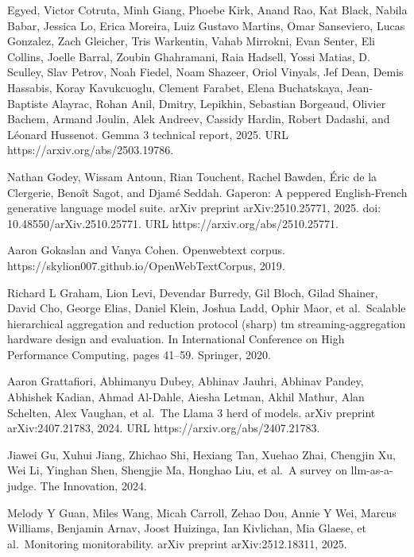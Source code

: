 Egyed, Victor Cotruta, Minh Giang, Phoebe Kirk, Anand Rao, Kat Black,
Nabila Babar, Jessica Lo, Erica Moreira, Luiz Gustavo Martins, Omar
Sanseviero, Lucas Gonzalez, Zach Gleicher, Tris Warkentin, Vahab
Mirrokni, Evan Senter, Eli Collins, Joelle Barral, Zoubin Ghahramani,
Raia Hadsell, Yossi Matias, D. Sculley, Slav Petrov, Noah Fiedel, Noam
Shazeer, Oriol Vinyals, Jef Dean, Demis Hassabis, Koray Kavukcuoglu,
Clement Farabet, Elena Buchatskaya, Jean-Baptiste Alayrac, Rohan Anil,
Dmitry, Lepikhin, Sebastian Borgeaud, Olivier Bachem, Armand Joulin,
Alek Andreev, Cassidy Hardin, Robert Dadashi, and Léonard Hussenot.
Gemma 3 technical report, 2025. URL https://arxiv.org/abs/2503.19786.

Nathan Godey, Wissam Antoun, Rian Touchent, Rachel Bawden, Éric de la
Clergerie, Benoît Sagot, and Djamé Seddah. Gaperon: A peppered
English-French generative language model suite. arXiv preprint
arXiv:2510.25771, 2025. doi: 10.48550/arXiv.2510.25771. URL
https://arxiv.org/abs/2510.25771.

Aaron Gokaslan and Vanya Cohen. Openwebtext corpus.
https://skylion007.github.io/OpenWebTextCorpus, 2019.

Richard L Graham, Lion Levi, Devendar Burredy, Gil Bloch, Gilad Shainer,
David Cho, George Elias, Daniel Klein, Joshua Ladd, Ophir Maor, et
al.~Scalable hierarchical aggregation and reduction protocol (sharp) tm
streaming-aggregation hardware design and evaluation. In International
Conference on High Performance Computing, pages 41--59. Springer, 2020.

Aaron Grattafiori, Abhimanyu Dubey, Abhinav Jauhri, Abhinav Pandey,
Abhishek Kadian, Ahmad Al-Dahle, Aiesha Letman, Akhil Mathur, Alan
Schelten, Alex Vaughan, et al.~The Llama 3 herd of models. arXiv
preprint arXiv:2407.21783, 2024. URL https://arxiv.org/abs/2407.21783.

Jiawei Gu, Xuhui Jiang, Zhichao Shi, Hexiang Tan, Xuehao Zhai, Chengjin
Xu, Wei Li, Yinghan Shen, Shengjie Ma, Honghao Liu, et al.~A survey on
llm-as-a-judge. The Innovation, 2024.

Melody Y Guan, Miles Wang, Micah Carroll, Zehao Dou, Annie Y Wei, Marcus
Williams, Benjamin Arnav, Joost Huizinga, Ian Kivlichan, Mia Glaese, et
al.~Monitoring monitorability. arXiv preprint arXiv:2512.18311, 2025.

